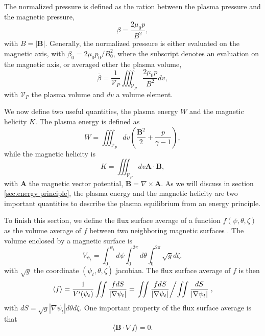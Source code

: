 \documentclass[my_thesis.tex]{subfiles}
\begin{document}
The normalized pressure is defined as the ration between the plasma pressure and the magnetic pressure,
\begin{equation}
	\beta = \frac{2\mu_0 p}{B^2},
\end{equation}
with $B=|\mathbf{B}|$. Generally, the normalized pressure is either evaluated on the magnetic axis, with $\beta_0=2\mu_0 p_0/B_0^2$, where the subscript denotes an evaluation on the magnetic axis, or averaged other the plasma volume,
\begin{equation}
	\bar\beta = \frac{1}{\mathcal{V}_P} \iiint_{\mathcal{V}_P} \frac{2\mu_0 p}{B^2} dv,
\end{equation}
with $\mathcal{V}_P$ the plasma volume and $dv$ a volume element.

We now define two useful quantities, the plasma energy $W$ and the magnetic helicity $K$. The plasma energy is defined as 
\begin{equation}
	W = \iiint_{\mathcal{V}_P} dv \left(\frac{\mathbf{B}^2}{2} + \frac{p}{\gamma-1}\right), \label{eq. energy functional}
\end{equation}
while the magnetic helicity is
\begin{equation}
	K = \iiint_{\mathcal{V}_P} dv \mathbf{A} \cdot \mathbf{B},
\end{equation}
with $\mathbf{A}$ the magnetic vector potential, $\mathbf{B}=\nabla\times\mathbf{A}$. As we will discuss in section \ref{sec.energy principle}, the plasma energy and the magnetic helicity are two important quantities to describe the plasma equilibrium from an energy principle.

To finish this section, we define the flux surface average of a function $f(\psi,\theta,\zeta)$ as the volume average of $f$ between two neighboring magnetic surfaces \citep{helanderTheoryPlasmaConfinement2014}. The volume enclosed by a magnetic surface is
\begin{equation}
	V_{\psi_t} = \int_0^{\psi_t} d\psi \int_0^{2\pi} d\theta \int_0^{2\pi} \sqrt{g}d\zeta,
\end{equation}
with $\sqrt{g}$ the coordinate $(\psi_t, \theta, \zeta)$ jacobian. The flux surface average of $f$ is then
\begin{equation}
	\langle f \rangle = \frac{1}{V'(\psi_t)}\iint \frac{f dS}{|\nabla \psi_t|} = \left.\iint \frac{f dS}{|\nabla \psi_t|} \middle/ \iint\frac{dS}{|\nabla \psi_t|} \right.,
\end{equation}
with $dS=\sqrt{g}|\nabla\psi_t|d\theta d\zeta$. One important property of the flux surface average is that
\begin{equation}
	\langle \mathbf{B}\cdot\nabla f\rangle = 0. \label{eq.property_flux_average}
\end{equation}
\end{document}
